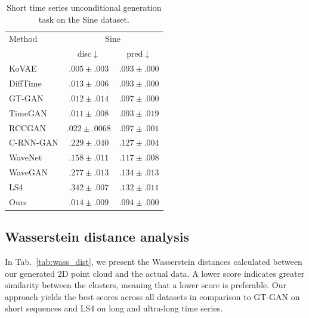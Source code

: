 \documentclass{article}
\begin{document}
\begin{table}[!ht]
    \centering
    \caption{Short time series unconditional generation task on the Sine dataset.}
    \label{tab:short_ts_uncond_cont}
    \setlength{\tabcolsep}{1pt}
    \begin{tabular}{l|c|c}
        \toprule
        Method & \multicolumn{2}{c}{Sine} \\ 
        & disc$\downarrow$ & pred$\downarrow$ \\
        \midrule
        KoVAE & $\boldsymbol{.005 \pm .003}$ & $\boldsymbol{.093 \pm .000}$ \\
        DiffTime & $.013 \pm .006$ & $\boldsymbol{.093 \pm .000}$ \\
        GT-GAN & $.012 \pm .014$ & $.097 \pm .000$ \\
        TimeGAN & $.011 \pm .008$ & $.093 \pm .019$ \\
        RCCGAN & $.022 \pm .0068$ & $.097 \pm .001$ \\
        C-RNN-GAN & $.229 \pm .040$ & $.127 \pm .004$ \\
        WaveNet & $.158 \pm .011$ & $.117 \pm .008 $ \\
        WaveGAN & $.277 \pm .013$ & $.134 \pm .013$ \\
        LS4 & $ .342 \pm .007$ & $ .132 \pm .011$ \\
        \midrule
        Ours  & $.014 \pm .009$ & $.094 \pm .000$ \\
        \bottomrule
    \end{tabular}
\end{table}


\subsection{Wasserstein distance analysis}

In Tab.~\ref{tab:wass_dist}, we present the Wasserstein distances calculated between our generated 2D point cloud and the actual data. A lower score indicates greater similarity between the clusters, meaning that a lower score is preferable. Our approach yields the best scores across all datasets in comparison to GT-GAN on short sequences and LS4 on long and ultra-long time series.
\end{document}
